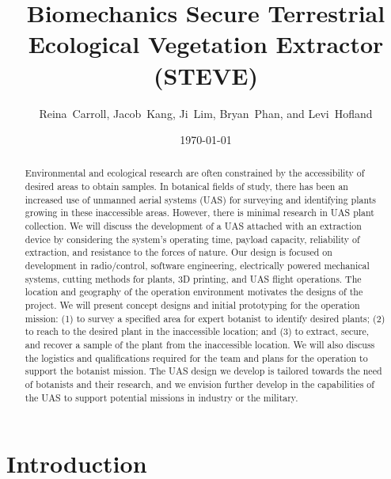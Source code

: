 \documentclass{wrcecapstone}
\title{Biomechanics Secure Terrestrial {\nobreak Ecological} Vegetation Extractor (STEVE)}
\author{Reina~Carroll, Jacob~Kang, Ji~Lim, Bryan~Phan, and Levi~Hofland}
\date{\today}
\begin{document}
\maketitlepage
\cleardoublepage
\tableofcontents
\listoffigures
\listoftables

\clearpage
\maketitle


\begin{abstract}
Environmental and ecological research are often constrained by the accessibility of desired areas to obtain samples. In botanical fields of study, there has been an increased use of unmanned aerial systems (UAS) for surveying and identifying plants growing in these inaccessible areas. However, there is minimal research in UAS plant collection. We will discuss the development of a UAS attached with an extraction device by considering the system’s operating time, payload capacity, reliability of extraction, and resistance to the forces of nature. Our design is focused on development in radio/control, software engineering, electrically powered mechanical systems, cutting methods for plants, 3D printing, and UAS flight operations. The location and geography of the operation environment motivates the designs of the project. We will present concept designs and initial prototyping for the operation mission: (1) to survey a specified area for expert botanist to identify desired plants; (2) to reach to the desired plant in the inaccessible location; and (3) to extract, secure, and recover a sample of the plant from the inaccessible location. We will also discuss the logistics and qualifications required for the team and plans for the operation to support the botanist mission. The UAS design we develop is tailored towards the need of botanists and their research, and we envision further develop in the capabilities of the UAS to support potential missions in industry or the military.
\end{abstract}

\section{Introduction}
\end{document}
